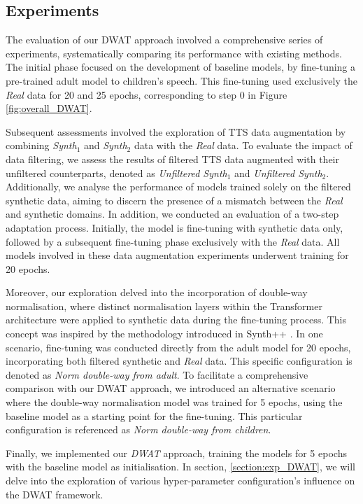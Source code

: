 \subsection{Experiments}
The evaluation of our \ac{DWAT} approach involved a comprehensive series of experiments, systematically comparing its performance with existing methods. The initial phase focused on the development of baseline models, by fine-tuning a pre-trained adult model to children's speech. This fine-tuning used exclusively the \textit{Real} data for 20 and 25 epochs, corresponding to step 0 in Figure \ref{fig:overall_DWAT}.

Subsequent assessments involved the exploration of \ac{TTS} data augmentation by combining \textit{Synth$_1$} and \textit{Synth$_2$} data with the \textit{Real} data. To evaluate the impact of data filtering, we assess the results of filtered \ac{TTS} data augmented with their unfiltered counterparts, denoted as \textit{Unfiltered Synth$_1$} and \textit{Unfiltered Synth$_2$}. Additionally, we analyse the performance of models trained solely on the filtered synthetic data, aiming to discern the presence of a mismatch between the \textit{Real} and synthetic domains. In addition, we conducted an evaluation of a two-step adaptation process. Initially, the model is fine-tuning with synthetic data only, followed by a subsequent fine-tuning phase exclusively with the \textit{Real} data. All models involved in these data augmentation experiments underwent training for 20 epochs.

Moreover, our exploration delved into the incorporation of double-way normalisation, where distinct normalisation layers within the Transformer architecture were applied to synthetic data during the fine-tuning process. This concept was inspired by the methodology introduced in Synth++ \cite{hu2022synt++}. In one scenario, fine-tuning was conducted directly from the adult model for 20 epochs, incorporating both filtered synthetic and \textit{Real} data. This specific configuration is denoted as \textit{Norm double-way from adult}. To facilitate a comprehensive comparison with our \ac{DWAT} approach, we introduced an alternative scenario where the double-way normalisation model was trained for 5 epochs, using the baseline model as a starting point for the fine-tuning. This particular configuration is referenced as \textit{Norm double-way from children}.

Finally, we implemented our \textit{\ac{DWAT}} approach, training the models for 5 epochs with the baseline model as initialisation. In section, \ref{section:exp_DWAT}, we will delve into the exploration of various hyper-parameter configuration's influence on the \ac{DWAT} framework.

